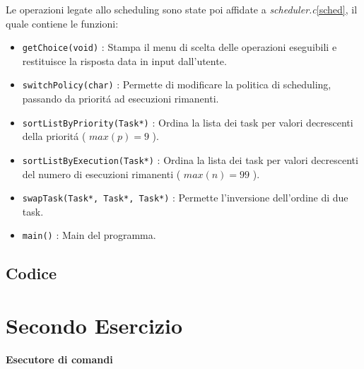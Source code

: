 \documentclass[a4paper]{article}
\begin{document}
Le operazioni legate allo scheduling sono state poi affidate a \textit{scheduler.c}\ref{sched}, il quale contiene le funzioni:

\begin{itemize}
\item \texttt{getChoice(void)} : Stampa il menu di scelta delle operazioni eseguibili e restituisce la risposta data in input dall'utente.

\item \texttt{switchPolicy(char)} : Permette di modificare la politica di scheduling, passando da priorit\'a ad esecuzioni rimanenti.

\item \texttt{sortListByPriority(Task*)} : Ordina la lista dei task per valori decrescenti della priorit\'a ( $max(p)=9$ ).

\item \texttt{sortListByExecution(Task*)} : Ordina la lista dei task per valori decrescenti del numero di esecuzioni rimanenti ( $max(n)=99$ ).

\item \texttt{swapTask(Task*, Task*, Task*)} : Permette l'inversione dell'ordine di due task.

\item \texttt{main()} : Main del programma.
\end{itemize}


\subsection{Codice}




\newpage
\section{Secondo Esercizio}
\textbf{Esecutore di comandi}
\end{document}
